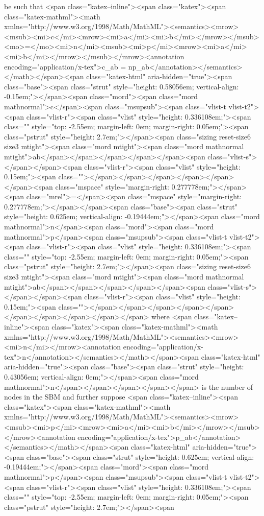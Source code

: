 be such that <span class="katex--inline"><span class="katex"><span class="katex-mathml"><math xmlns="http://www.w3.org/1998/Math/MathML"><semantics><mrow><msub><mi>c</mi><mrow><mi>a</mi><mi>b</mi></mrow></msub><mo>=</mo><mi>n</mi><msub><mi>p</mi><mrow><mi>a</mi><mi>b</mi></mrow></msub></mrow><annotation encoding="application/x-tex">c_{ab} = np_{ab}</annotation></semantics></math></span><span class="katex-html" aria-hidden="true"><span class="base"><span class="strut" style="height: 0.58056em; vertical-align: -0.15em;"></span><span class="mord"><span class="mord mathnormal">c</span><span class="msupsub"><span class="vlist-t vlist-t2"><span class="vlist-r"><span class="vlist" style="height: 0.336108em;"><span class="" style="top: -2.55em; margin-left: 0em; margin-right: 0.05em;"><span class="pstrut" style="height: 2.7em;"></span><span class="sizing reset-size6 size3 mtight"><span class="mord mtight"><span class="mord mathnormal mtight">ab</span></span></span></span></span><span class="vlist-s">​</span></span><span class="vlist-r"><span class="vlist" style="height: 0.15em;"><span class=""></span></span></span></span></span></span><span class="mspace" style="margin-right: 0.277778em;"></span><span class="mrel">=</span><span class="mspace" style="margin-right: 0.277778em;"></span></span><span class="base"><span class="strut" style="height: 0.625em; vertical-align: -0.19444em;"></span><span class="mord mathnormal">n</span><span class="mord"><span class="mord mathnormal">p</span><span class="msupsub"><span class="vlist-t vlist-t2"><span class="vlist-r"><span class="vlist" style="height: 0.336108em;"><span class="" style="top: -2.55em; margin-left: 0em; margin-right: 0.05em;"><span class="pstrut" style="height: 2.7em;"></span><span class="sizing reset-size6 size3 mtight"><span class="mord mtight"><span class="mord mathnormal mtight">ab</span></span></span></span></span><span class="vlist-s">​</span></span><span class="vlist-r"><span class="vlist" style="height: 0.15em;"><span class=""></span></span></span></span></span></span></span></span></span></span> where <span class="katex--inline"><span class="katex"><span class="katex-mathml"><math xmlns="http://www.w3.org/1998/Math/MathML"><semantics><mrow><mi>n</mi></mrow><annotation encoding="application/x-tex">n</annotation></semantics></math></span><span class="katex-html" aria-hidden="true"><span class="base"><span class="strut" style="height: 0.43056em; vertical-align: 0em;"></span><span class="mord mathnormal">n</span></span></span></span></span> is the number of nodes in the SBM and further suppose <span class="katex--inline"><span class="katex"><span class="katex-mathml"><math xmlns="http://www.w3.org/1998/Math/MathML"><semantics><mrow><msub><mi>p</mi><mrow><mi>a</mi><mi>b</mi></mrow></msub></mrow><annotation encoding="application/x-tex">p_{ab}</annotation></semantics></math></span><span class="katex-html" aria-hidden="true"><span class="base"><span class="strut" style="height: 0.625em; vertical-align: -0.19444em;"></span><span class="mord"><span class="mord mathnormal">p</span><span class="msupsub"><span class="vlist-t vlist-t2"><span class="vlist-r"><span class="vlist" style="height: 0.336108em;"><span class="" style="top: -2.55em; margin-left: 0em; margin-right: 0.05em;"><span class="pstrut" style="height: 2.7em;"></span><span 